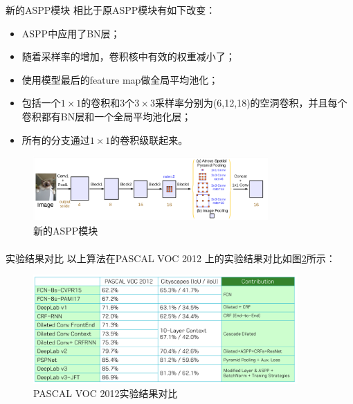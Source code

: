 \documentclass{beamer}
\newcommand{\upcite}[1]{\textsuperscript{\textsuperscript{\cite{#1}}}}
\begin{document}
\begin{frame}{新的ASPP模块}
相比于原ASPP模块有如下改变：
\begin{itemize}
	\item ASPP中应用了BN层；
	\item 随着采样率的增加，卷积核中有效的权重减小了；
	\item 使用模型最后的feature map做全局平均池化；
	\item 包括一个$1\times 1$的卷积和3个$3\times 3$采样率分别为(6,12,18)的空洞卷积，并且每个卷积都有BN层和一个全局平均池化层；
	\item 所有的分支通过$1\times 1$的卷积级联起来。
\end{itemize}

\begin{figure}[h]
	\centering
	\includegraphics[width=0.8\textwidth]{images/asppnew.png}
	\caption{\label{asppnew}新的ASPP模块}
\end{figure}

\end{frame}

\begin{frame}{实验结果对比}
以上算法在PASCAL VOC 2012 \upcite{everingham2015pascal}上的实验结果对比如图\ref{result0}所示：
\begin{figure}[h]
	\centering
	\includegraphics[width=0.9\textwidth]{images/result0.png}
	\caption{\label{result0}PASCAL VOC 2012实验结果对比}
\end{figure}
\end{frame}
\end{document}

